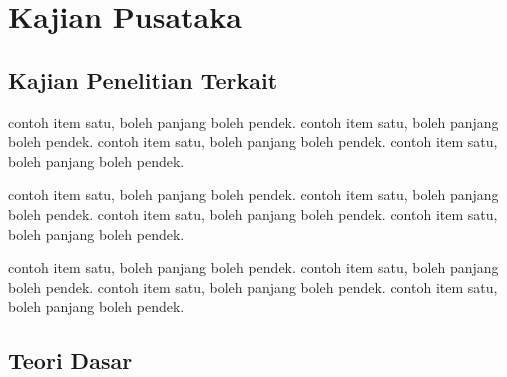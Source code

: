 \chapter{Kajian Pusataka}{
    \lipsum[4]
}


\section{Kajian Penelitian Terkait}{
    \lipsum[6]
    \begin{f_enumerate}
        \item contoh item satu, boleh panjang boleh pendek. contoh item satu, boleh panjang boleh pendek. contoh item satu, boleh panjang boleh pendek. contoh item satu, boleh panjang boleh pendek.
        \item contoh item satu, boleh panjang boleh pendek. contoh item satu, boleh panjang boleh pendek. contoh item satu, boleh panjang boleh pendek. contoh item satu, boleh panjang boleh pendek.
        \item contoh item satu, boleh panjang boleh pendek. contoh item satu, boleh panjang boleh pendek. contoh item satu, boleh panjang boleh pendek. contoh item satu, boleh panjang boleh pendek.
    \end{f_enumerate}
    \lipsum[2]
}


\section{Teori Dasar}{
    \lipsum[9-11]
}

